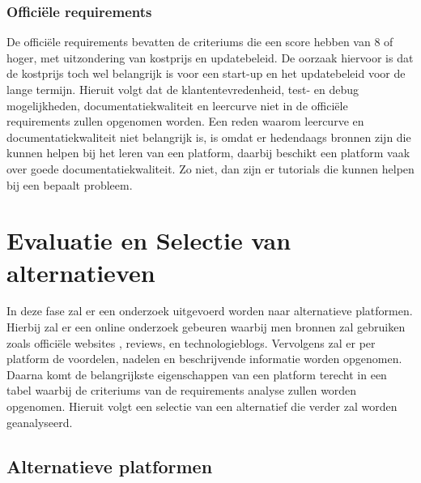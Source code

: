 \subsubsection*{Officiële requirements}
De officiële requirements bevatten de criteriums die een score hebben van 8 of hoger, 
met uitzondering van kostprijs en updatebeleid. De oorzaak hiervoor is dat de 
kostprijs toch wel belangrijk is voor een start-up en het updatebeleid voor 
de lange termijn. Hieruit volgt dat de klantentevredenheid, test- en debug mogelijkheden, 
documentatiekwaliteit en leercurve niet in de officiële requirements zullen opgenomen worden. 
Een reden waarom leercurve en documentatiekwaliteit niet belangrijk is, is omdat er hedendaags bronnen 
zijn die kunnen helpen bij het leren van een platform, daarbij beschikt een platform vaak over goede documentatiekwaliteit. Zo niet, 
dan zijn er tutorials die kunnen helpen bij een bepaalt probleem.



\section*{Evaluatie en Selectie van alternatieven}
\label{sec:evaluatie-en-selectie-van-alternatieven}
In deze fase zal er een onderzoek uitgevoerd worden naar alternatieve platformen.
Hierbij zal er een online onderzoek gebeuren waarbij men bronnen zal gebruiken zoals 
officiële websites , reviews, en technologieblogs. Vervolgens zal er per platform de 
voordelen, nadelen en beschrijvende informatie worden opgenomen. Daarna komt 
de belangrijkste eigenschappen van een platform terecht in een tabel waarbij de criteriums
van de requirements analyse zullen worden opgenomen. Hieruit volgt een selectie van een 
alternatief die verder zal worden geanalyseerd.
\subsection*{Alternatieve platformen}
\label{subsec:alternatieve-platformen}

